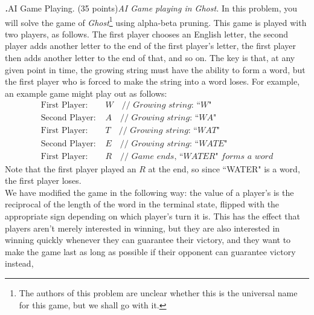 \documentclass[12pt]{amsart}
\newenvironment{statement}[1]{\smallskip\noindent\color[rgb]{0.0,0.0,0.0} {\bf #1.}}{}
\newcommand{\1}{\mathds{1}}
\begin{document}
\begin{statement}{5}
\textit{AI Game Playing.} (35 points)\emph{AI Game playing in Ghost. }In this problem, you will solve the game of \textit{Ghost}\footnote{The authors of this problem are unclear whether this is the universal name for this game, but we shall go with it.} using alpha-beta pruning. This game is played with two players, as follows. The first player chooses an English letter, the second player adds another letter to the end of the first player's letter, the first player then adds another letter to the end of that, and so on. The key is that, at any given point in time, the growing string must have the ability to form a word, but the first player who is forced to make the string into a word loses. For example, an example game might play out as follows:
\begin{align*}
    \text{First Player: }& W \quad \textit{// Growing string: ``W"} \\
    \text{Second Player: }& A \quad \textit{// Growing string: ``WA"} \\
    \text{First Player: }& T \quad \textit{// Growing string: ``WAT"} \\
    \text{Second Player: }& E \quad \textit{// Growing string: ``WATE"} \\
    \text{First Player: }& R \quad \textit{// Game ends, ``WATER" forms a word}
\end{align*}
Note that the first player played an $R$ at the end, so since ``WATER" is a word, the first player loses. \\

We have modified the game in the following way: the value of a player's is the reciprocal of the length of the word in the terminal state, flipped with the appropriate sign depending on which player's turn it is.
This has the effect that players aren't merely interested in winning, but they are also interested in winning quickly whenever they can guarantee their victory, and they want to make the game last as long as possible if their opponent can guarantee victory instead,


\end{statement}
\end{document}
